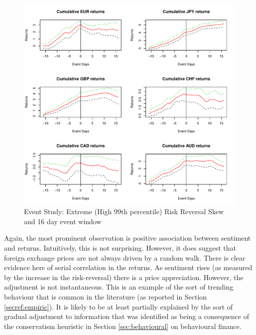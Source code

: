 \documentclass[12pt, a4paper, oneside]{article} %
\begin{document}
\begin{figure}[h!]
\graphicspath{{../Figures/}}
\centering
\caption{Event Study:  Extreme (High 99th percentile) Risk Reversal Skew and 16 day event window}
\label{fig:ES1}
\includegraphics[scale=0.8]{RRCum16}
\end{figure}

Again, the most prominent observation is positive association between sentiment and returns.  Intuitively, this is not surprising.  However, it does suggest that foreign exchange prices are not always driven by a random walk. There is clear evidence here of serial correlation in the returns. As sentiment rises (as measured by the increase in the risk-reversal) there is a price appreciation. However, the adjustment is not instantaneous.  This is an example of the sort of trending behaviour that is common in the literature (as reported in Section \ref{secref:empiric}).  It is likely to be at least partially explained by the sort of gradual adjustment to information that was identified as being a consequence of the conservatism heuristic in Section \ref{sec:behavioural} on behavioural finance. 
\end{document}
